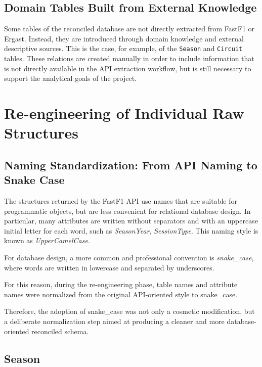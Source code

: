 \documentclass[12pt,a4paper]{article}
\begin{document}
	\subsection{Domain Tables Built from External Knowledge}
	Some tables of the reconciled database are not directly extracted from FastF1 or Ergast.
	Instead, they are introduced through domain knowledge and external descriptive sources.
	This is the case, for example, of the \texttt{Season} and \texttt{Circuit} tables.
	These relations are created manually in order to include information that is not directly available in the API extraction workflow, but is still necessary to support the analytical goals of the project.
	
	
	

	\section{Re-engineering of Individual Raw Structures}
	
	
	\subsection{Naming Standardization: From API Naming to Snake Case}
	
	
	The structures returned by the FastF1 API use names that are suitable for programmatic objects, but are less convenient for relational database design.
	In particular, many attributes are written without separators and with an uppercase initial letter for each word, such as \textit{SeasonYear}, \textit{SessionType}.
	This naming style is known as  \textit{UpperCamelCase}.
	
	For database design, a more common and professional convention is \textit{snake\_case}, where words are written in lowercase and separated by underscores.
	
	For this reason, during the re-engineering phase, table names and attribute names were normalized from the original API-oriented style to snake\_case.

	
	Therefore, the adoption of snake\_case was not only a cosmetic modification, but a deliberate normalization step aimed at producing a cleaner and more database-oriented reconciled schema.
	
	\subsection{Season}
	
\end{document}
